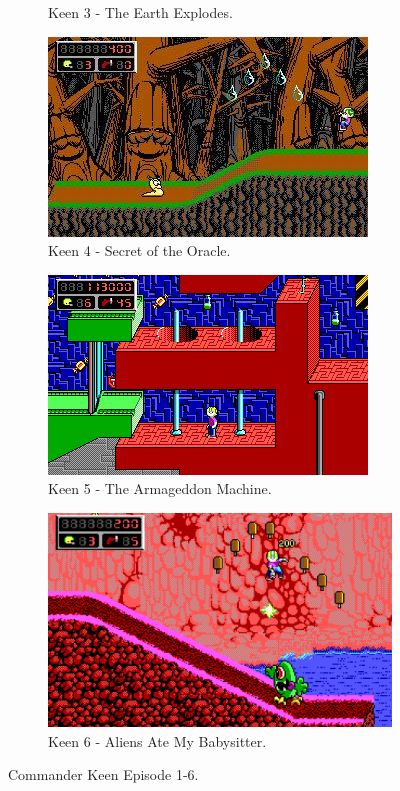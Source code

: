 \documentclass[book.tex]{subfiles}
\begin{document}
\begin{figure}[H]
\begin{subfigure}{.5\textwidth}
  \caption*{Keen 3 - The Earth Explodes.}
\end{subfigure}
\begin{subfigure}{.5\textwidth}
  \centering
  \includegraphics[width=.95\textwidth]{screenshots_300dpi/keen2_1.jpg}
  \caption*{Keen 4 - Secret of the Oracle.}
\end{subfigure}
\par\bigskip %
\begin{subfigure}{.5\textwidth}
  \centering
  \includegraphics[width=.95\textwidth]{screenshots_300dpi/keen2_2.png}
  \caption*{Keen 5 - The Armageddon Machine.}
\end{subfigure}
\begin{subfigure}{.5\textwidth}
  \centering
  \includegraphics[width=.95\textwidth]{screenshots_300dpi/keen3_1.png}
  \caption*{Keen 6 - Aliens Ate My Babysitter.}
\end{subfigure}
\caption{Commander Keen Episode 1-6.}
\label{fig:draw_layers}
\end{figure}
\end{document}
